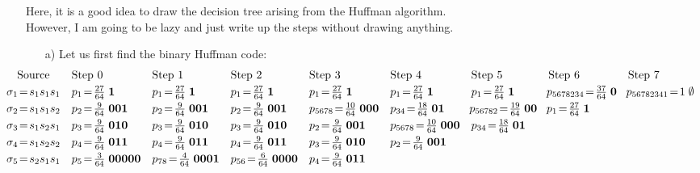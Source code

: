 \documentclass[11pt]{article}
\begin{document}
\newpage
{}
Here, it is a good idea to draw the decision tree arising from the Huffman algorithm.\\
However, I am going to be lazy and just write up the steps without drawing anything.
\begin{itemize}
  \item[{a)}] Let us first find the binary Huffman code:
{\scriptsize\[\hspace*{-20mm}\begin{array}{cllllllll}
  \text{Source}          & \text{Step 0}                       & \text{Step 1}                          & \text{Step 2}                         & \text{Step 3}                          & \text{Step 4}                          & \text{Step 5}                          & \text{Step 6}                           & \text{Step 7}\\[1mm]
    \sigma_1 \!=\! s_1s_1s_1 & p_1 \!=\! \frac{27}{64}\;\mathbf{    1} & p_1    \!=\! \frac{27}{64}\;\mathbf{    1} & p_1    \!=\! \frac{27}{64}\;\mathbf{   1} & p_1      \!=\! \frac{27}{64}\;\mathbf{  1} & p_1      \!=\! \frac{27}{64}\;\mathbf{  1} &   p_1       \!=\! \frac{27}{64}\;\mathbf{ 1} & \!p_{5678234} \!=\! \frac{37}{64}\;\mathbf{0} & \!p_{56782341} \!=\! 1\;\mathbf{\emptyset}\\[1mm]
    \sigma_2 \!=\! s_1s_1s_2 & p_2 \!=\! \frac{ 9}{64}\;\mathbf{  001} & p_2    \!=\! \frac{ 9}{64}\;\mathbf{  001} & p_2    \!=\! \frac{ 9}{64}\;\mathbf{ 001} & p_{5678} \!=\! \frac{10}{64}\;\mathbf{000} & p_{34}   \!=\! \frac{18}{64}\;\mathbf{ 01} & \!p_{56782} \!=\! \frac{19}{64}\;\mathbf{00} & \!p_1         \!=\! \frac{27}{64}\;\mathbf{1}\\[1mm]
    \sigma_3 \!=\! s_1s_2s_1 & p_3 \!=\! \frac{ 9}{64}\;\mathbf{  010} & p_3    \!=\! \frac{ 9}{64}\;\mathbf{  010} & p_3    \!=\! \frac{ 9}{64}\;\mathbf{ 010} & p_2      \!=\! \frac{ 9}{64}\;\mathbf{001} & p_{5678} \!=\! \frac{10}{64}\;\mathbf{000} &   p_{34}    \!=\! \frac{18}{64}\;\mathbf{01}\\[1mm]
    \sigma_4 \!=\! s_1s_2s_2 & p_4 \!=\! \frac{ 9}{64}\;\mathbf{  011} & p_4    \!=\! \frac{ 9}{64}\;\mathbf{  011} & p_4    \!=\! \frac{ 9}{64}\;\mathbf{ 011} & p_3      \!=\! \frac{ 9}{64}\;\mathbf{010} & p_2      \!=\! \frac{ 9}{64}\;\mathbf{001}\\[1mm]
    \sigma_5 \!=\! s_2s_1s_1 & p_5 \!=\! \frac{ 3}{64}\;\mathbf{00000} & p_{78} \!=\! \frac{ 4}{64}\;\mathbf{ 0001} & p_{56} \!=\! \frac{ 6}{64}\;\mathbf{0000} & p_4      \!=\! \frac{ 9}{64}\;\mathbf{011}\\[1mm]

\end{array}\]}
\end{itemize}
\end{document}
